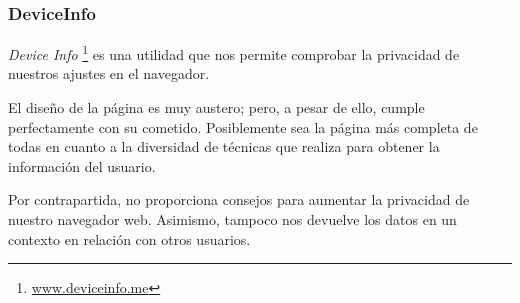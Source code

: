 \subsubsection{DeviceInfo}

\textit{Device Info} \footnote{\url{www.deviceinfo.me}} es una utilidad que nos permite comprobar la privacidad de nuestros ajustes en el navegador. \par

El diseño de la página es muy austero; pero, a pesar de ello, cumple perfectamente con su cometido. Posiblemente sea la página más completa de todas en cuanto a la diversidad de técnicas que realiza para obtener la información del usuario. \par

Por contrapartida, no proporciona consejos para aumentar la privacidad de nuestro navegador web. Asimismo, tampoco nos devuelve los datos en un contexto en relación con otros usuarios. \par


